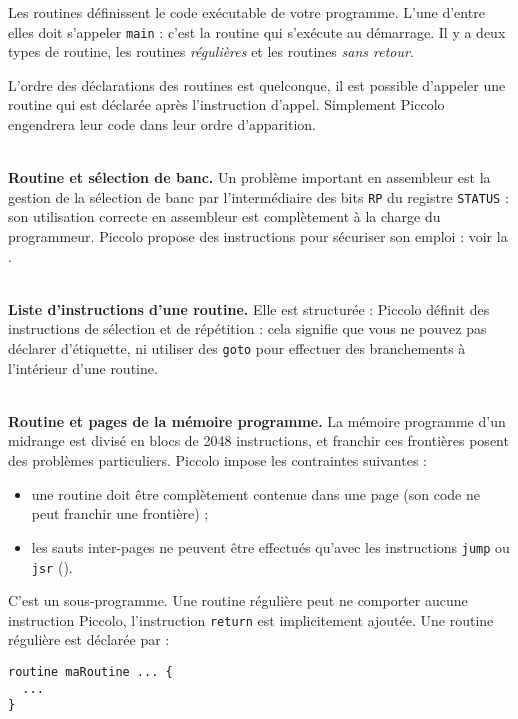 
Les routines définissent le code exécutable de votre programme. L’une d’entre elles doit s’appeler \texttt{main} : c’est la routine qui s’exécute au démarrage. Il y a deux types de routine, les routines \emph{régulières} et les routines \emph{sans retour}.


L’ordre des déclarations des routines est quelconque, il est possible d’appeler une routine qui est déclarée après l’instruction d’appel. Simplement Piccolo engendrera leur code dans leur ordre d’apparition. 

~\\
\textbf{Routine et sélection de banc.} Un problème important en assembleur est la gestion de la sélection de banc par l’intermédiaire des bits \texttt{RP} du registre \texttt{STATUS} : son utilisation correcte en assembleur est complètement à la charge du programmeur. Piccolo propose des instructions pour sécuriser son emploi : voir la .

~\\
\textbf{Liste d’instructions d’une routine.} Elle est structurée : Piccolo définit des instructions de sélection et de répétition : cela signifie que vous ne pouvez pas déclarer d’étiquette, ni utiliser des \texttt{goto} pour effectuer des branchements à l’intérieur d’une routine.

~\\
\textbf{Routine et pages de la mémoire programme.} La mémoire programme d’un midrange est divisé en blocs de 2048 instructions, et franchir ces frontières posent des problèmes particuliers. Piccolo impose les contraintes suivantes :\begin{itemize}
  \item une routine doit être complètement contenue dans une page (son code ne peut franchir une frontière) ;
  \item les sauts inter-pages ne peuvent être effectués qu’avec les instructions \texttt{jump} ou \texttt{jsr} ().
\end{itemize}


C'est un sous-programme. Une routine régulière peut ne comporter aucune instruction Piccolo, l'instruction \texttt{return} est implicitement ajoutée. Une routine régulière est déclarée par :
\begin{lstlisting}[language=piccolo]
routine maRoutine ... {
  ...
}
\end{lstlisting}

